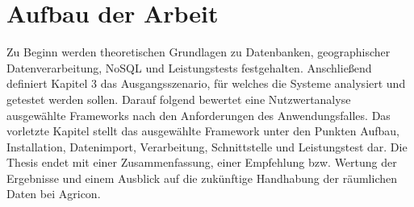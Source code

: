 \section{Aufbau der Arbeit}


Zu Beginn werden theoretischen Grundlagen zu Datenbanken, geographischer Datenverarbeitung, NoSQL und Leistungstests festgehalten.
Anschließend definiert Kapitel 3 das Ausgangsszenario, für welches die Systeme analysiert und getestet werden sollen.
Darauf folgend bewertet eine Nutzwertanalyse ausgewählte Frameworks nach den Anforderungen des Anwendungsfalles.
Das vorletzte Kapitel stellt das ausgewählte Framework unter den Punkten Aufbau, Installation, Datenimport, Verarbeitung, Schnittstelle und Leistungstest dar.
Die Thesis endet mit einer Zusammenfassung, einer Empfehlung bzw. Wertung der Ergebnisse und einem Ausblick auf die zukünftige Handhabung der räumlichen Daten bei Agricon.